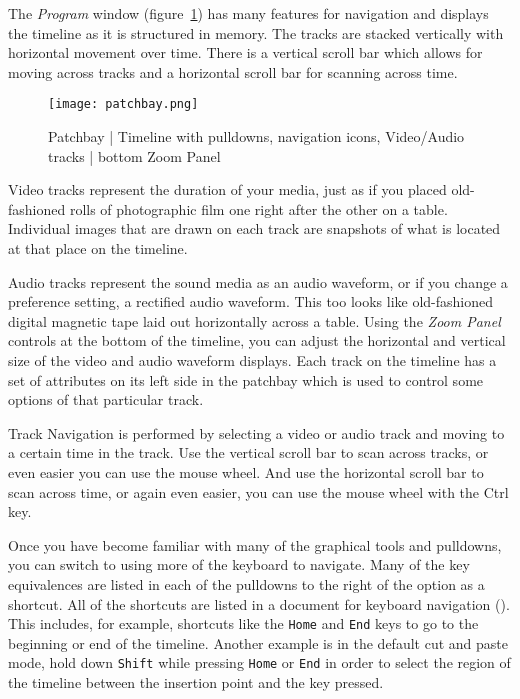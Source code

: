 The \textit{Program} window (figure~\ref{fig:patchbay}) has many features for navigation and displays the timeline as it is structured in memory. The tracks are stacked vertically with horizontal movement over time.
There is a vertical scroll bar which allows for moving across tracks and a horizontal scroll bar for scanning across time. 

\begin{figure}[htpb]
    \centering
    \texttt{[image: patchbay.png]}
    \caption{Patchbay  | Timeline with pulldowns, navigation icons, Video/Audio tracks | bottom Zoom Panel}
    \label{fig:patchbay}
\end{figure}

Video tracks represent the duration of your media, just as if you placed old-fashioned rolls of photographic
film one right after the other on a table.
Individual images that are drawn on each track are snapshots of what is located at that place on the timeline.

Audio tracks represent the sound media as an audio waveform, or if you change a preference setting, a rectified audio waveform. 
This too looks like old-fashioned digital magnetic tape laid out horizontally across a table.
Using the \textit{Zoom Panel} controls at the bottom of the timeline,
you can adjust the horizontal and vertical size of the video and audio waveform displays.
Each track on the timeline has a set of attributes on its left side in the patchbay which is used to 
control some options of that particular track. 

Track Navigation is performed by selecting a video or audio track and moving to a certain time in the track. 
Use the vertical scroll bar to scan across tracks, or even easier you can use the mouse wheel. 
And use the horizontal scroll bar to scan across time, or again even easier, you can use the mouse wheel with the Ctrl key.  

Once you have become familiar with many of the graphical tools and pulldowns, you can switch to using more of
the keyboard to navigate.  Many of the key equivalences are listed in each of the pulldowns to the right of the option
 as a shortcut. All of the shortcuts are listed in a document for keyboard 
navigation (). This includes, for example, shortcuts like the \texttt{Home} and \texttt{End} keys to go to the beginning or end of the timeline.  
Another example is in the default cut and paste mode, hold down \texttt{Shift} while pressing \texttt{Home} or \texttt{End} in order to select the region of the timeline between the insertion point and the key pressed.

